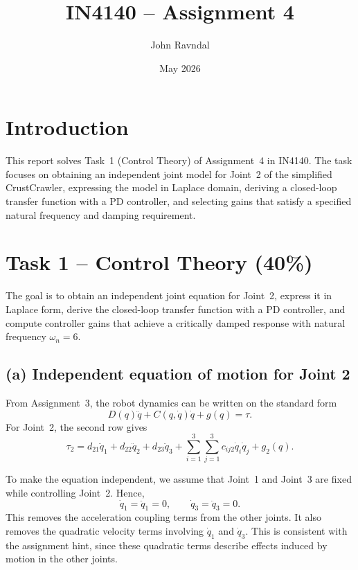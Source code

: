 \documentclass{article}
\title{IN4140 -- Assignment 4}
\author{John Ravndal}
\date{May 2026}
\begin{document}
\maketitle

\section{Introduction}

This report solves Task~1 (Control Theory) of Assignment~4 in IN4140. The task focuses on obtaining an independent joint model for Joint~2 of the simplified CrustCrawler, expressing the model in Laplace domain, deriving a closed-loop transfer function with a PD controller, and selecting gains that satisfy a specified natural frequency and damping requirement.

\section{Task 1 -- Control Theory (40\%)}

The goal is to obtain an independent joint equation for Joint~2, express it in Laplace form, derive the closed-loop transfer function with a PD controller, and compute controller gains that achieve a critically damped response with natural frequency $\omega_n=6$.

\subsection*{(a) Independent equation of motion for Joint 2}

From Assignment~3, the robot dynamics can be written on the standard form
\begin{equation}
    D(q)\ddot q + C(q,\dot q)\dot q + g(q) = \tau .
\end{equation}
For Joint~2, the second row gives
\begin{equation}
    \tau_2
    =
    d_{21}\ddot q_1
    +
    d_{22}\ddot q_2
    +
    d_{23}\ddot q_3
    +
    \sum_{i=1}^{3}\sum_{j=1}^{3} c_{ij2}\dot q_i \dot q_j
    +
    g_2(q).
    \label{eq:joint2_full}
\end{equation}

To make the equation independent, we assume that Joint~1 and Joint~3 are fixed while controlling Joint~2. Hence,
\begin{equation}
    \dot q_1 = \ddot q_1 = 0,
    \qquad
    \dot q_3 = \ddot q_3 = 0.
\end{equation}
This removes the acceleration coupling terms from the other joints. It also removes the quadratic velocity terms involving $\dot q_1$ and $\dot q_3$. This is consistent with the assignment hint, since these quadratic terms describe effects induced by motion in the other joints.
\end{document}
